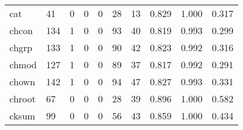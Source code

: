 \begin{longtable}{lp{1.3cm}p{1.3cm}p{1.3cm}p{1.3cm}p{1.3cm}p{1.3cm}p{1.3cm}p{1.3cm}p{1.3cm}}
cat       &                     41 &                                             0 &                                            0 &                                           0 &                                           28 &                                         13 &                                0.829 &                                  1.000 &                                0.317 \\
chcon     &                    134 &                                             1 &                                            0 &                                           0 &                                           93 &                                         40 &                                0.819 &                                  0.993 &                                0.299 \\
chgrp     &                    133 &                                             1 &                                            0 &                                           0 &                                           90 &                                         42 &                                0.823 &                                  0.992 &                                0.316 \\
chmod     &                    127 &                                             1 &                                            0 &                                           0 &                                           89 &                                         37 &                                0.817 &                                  0.992 &                                0.291 \\
chown     &                    142 &                                             1 &                                            0 &                                           0 &                                           94 &                                         47 &                                0.827 &                                  0.993 &                                0.331 \\
chroot    &                     67 &                                             0 &                                            0 &                                           0 &                                           28 &                                         39 &                                0.896 &                                  1.000 &                                0.582 \\
cksum     &                     99 &                                             0 &                                            0 &                                           0 &                                           56 &                                         43 &                                0.859 &                                  1.000 &                                0.434 \\

\end{longtable}
